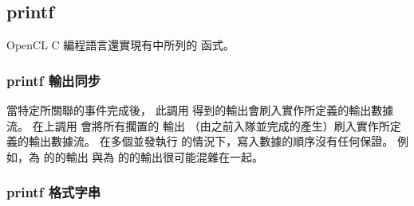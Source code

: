 \subsection{printf}

OpenCL C 編程語言還實現有中所列的  函式。

{}

\subsubsection{printf 輸出同步}

當特定所關聯的事件完成後，
此調用  得到的輸出會刷入實作所定義的輸出數據流。
在上調用  會將所有擱置的  輸出
（由之前入隊並完成的產生）刷入實作所定義的輸出數據流。
在多個並發執行  的情況下，寫入數據的順序沒有任何保證。
例如，為 的的輸出
與為 的的輸出很可能混雜在一起。

\subsubsection{printf 格式字串}

